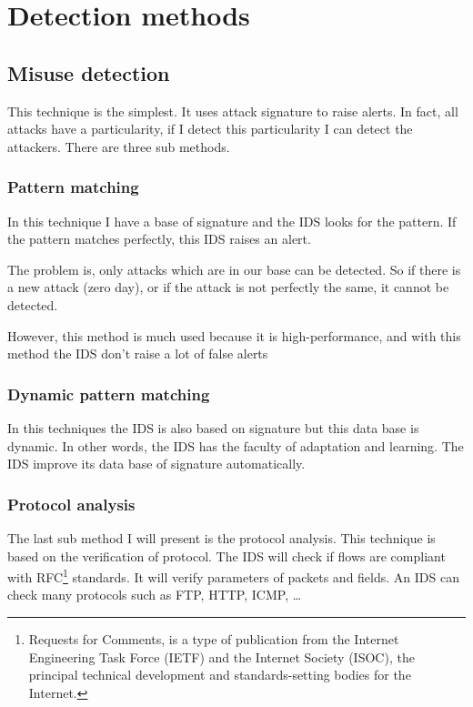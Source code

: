 \section{Detection methods}

\subsection{Misuse detection}

This technique is the simplest. It uses attack signature to raise alerts. In fact, all attacks have a particularity,
if I detect this particularity I can detect the attackers. There are three sub methods.

\subsubsection{Pattern matching}

In this technique I have a base of signature and the IDS looks for the pattern. If the pattern matches perfectly,
this IDS raises an alert.

The problem is, only attacks which are in our base can be detected. So if there is a new attack (zero day), or if
the attack is not perfectly the same, it cannot be detected.

However, this method is much used because it is high-performance, and with this method the IDS don't raise a lot of
false alerts

\subsubsection{Dynamic pattern matching}

In this techniques the IDS is also based on signature but this data base is dynamic. In other words, the IDS has
the faculty of adaptation and learning. The IDS improve its data base of signature automatically.

\subsubsection{Protocol analysis}

The last sub method I will present is the protocol analysis. This technique is based on the verification of
protocol. The IDS will check if flows are compliant with RFC\footnote{Requests for Comments, is a type of
  publication from the Internet Engineering Task Force (IETF) and the Internet Society (ISOC), the principal
  technical development and standards-setting bodies for the Internet.} standards. It will verify parameters of
packets and fields. An IDS can check many protocols such as FTP, HTTP, ICMP, \dots

